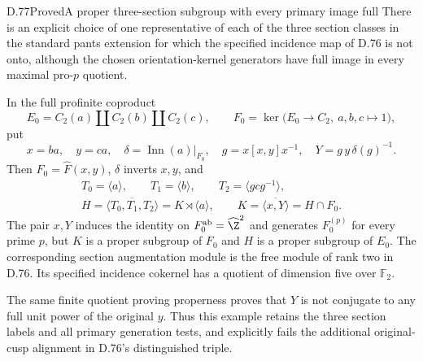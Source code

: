 \begin{claim}{D.77}{Proved}{A proper three-section subgroup with every primary image full}
There is an explicit choice of one representative of each
of the three section classes in the standard pants extension
for which the specified incidence map of D.76 is not onto,
although the chosen orientation-kernel generators have full
image in every maximal pro-$p$ quotient.

In the full profinite coproduct
\[
 E_0=C_2(a)\amalg C_2(b)\amalg C_2(c),\qquad
 F_0=\ker\bigl(E_0\longrightarrow C_2,\ a,b,c\longmapsto1\bigr),
                                                               \tag{D.77.1}
\]
put
\[
 x=ba,\quad y=ca,\quad
 \delta=\operatorname{Inn}(a)|_{F_0},\quad
 g=x[x,y]x^{-1},\quad
 Y=g\,y\,\delta(g)^{-1}.
                                                               \tag{D.77.2}
\]
Then $F_0=\widehat F(x,y)$, $\delta$ inverts $x,y$, and
\[
 \begin{gathered}
 T_0=\langle a\rangle,\qquad T_1=\langle b\rangle,\qquad
 T_2=\langle gcg^{-1}\rangle,\\
 H=\overline{\langle T_0,T_1,T_2\rangle}
       =K\rtimes\langle a\rangle,\qquad
 K=\overline{\langle x,Y\rangle}=H\cap F_0 .
 \end{gathered}                                                \tag{D.77.3}
\]
The pair $x,Y$ induces the identity on
$F_0^{\rm ab}=\widehat\Z^2$ and generates $F_0^{(p)}$
for every prime $p$, but $K$ is a proper subgroup of $F_0$
and $H$ is a proper subgroup of $E_0$.
The corresponding section augmentation module is the free
module of rank two in D.76. Its specified incidence cokernel
has a quotient of dimension five over $\mathbb F_2$.

The same finite quotient proving properness proves that
$Y$ is not conjugate to any full unit power of the original
$y$. Thus this example retains the three section labels
and all primary generation tests, and explicitly fails the
additional original-cusp alignment in D.76's distinguished
triple.
\end{claim}
